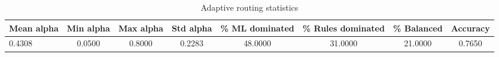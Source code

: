 \begin{table}[t]
\centering
\caption{Adaptive routing statistics}
\label{tab:table4_adaptive_routing}
\begin{tabular}{lccccccc}
\toprule
Mean alpha & Min alpha & Max alpha & Std alpha & \% ML dominated & \% Rules dominated & \% Balanced & Accuracy \\
\midrule
0.4308 & 0.0500 & 0.8000 & 0.2283 & 48.0000 & 31.0000 & 21.0000 & 0.7650 \\
\bottomrule
\end{tabular}
\end{table}
